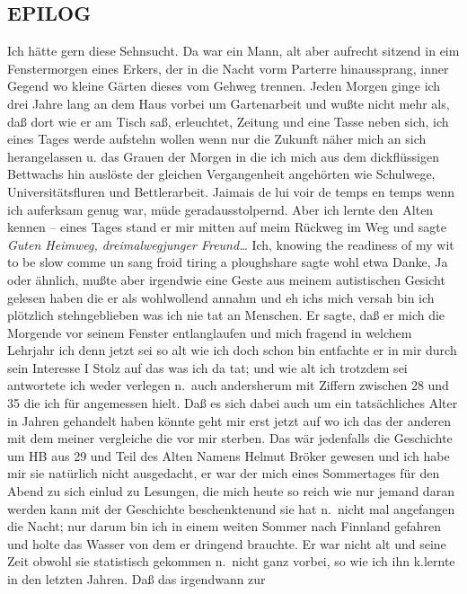 \documentclass[
]{article}
\author{}
\date{\vspace{-2.5em}}
\begin{document}
\subsection{EPILOG}\label{epilog}

Ich hätte gern diese Sehnsucht. Da war ein Mann, alt aber aufrecht
sitzend in eim Fenstermorgen eines Erkers, der in die Nacht vorm
Parterre hinaussprang, inner Gegend wo kleine Gärten dieses vom Gehweg
trennen. Jeden Morgen ginge ich drei Jahre lang an dem Haus vorbei um
Gartenarbeit und wußte nicht mehr als, daß dort wie er am Tisch saß,
erleuchtet, Zeitung und eine Tasse neben sich, ich eines Tages werde
aufstehn wollen wenn nur die Zukunft näher mich an sich herangelassen u.
das Grauen der Morgen in die ich mich aus dem dickflüssigen Bettwachs
hin auslöste der gleichen Vergangenheit angehörten wie Schulwege,
Universitätsfluren und Bettlerarbeit. J\textquotesingle aimais de lui
voir de temps en temps wenn ich auferksam genug war, müde
geradausstolpernd. Aber ich lernte den Alten kennen -- eines Tages stand
er mir mitten auf meim Rückweg im Weg und sagte \emph{Guten Heimweg,
dreimalwegjunger Freund\ldots{}} Ich, knowing the readiness of my wit to
be slow comme un sang froid tiring a ploughshare sagte wohl etwa Danke,
Ja oder ähnlich, mußte aber irgendwie eine Geste aus meinem autistischen
Gesicht gelesen haben die er als wohlwollend annahm und eh
ich\textquotesingle s mich versah bin ich plötzlich stehngeblieben was
ich nie tat an Menschen. Er sagte, daß er mich die Morgende vor seinem
Fenster entlanglaufen und mich fragend in welchem Lehrjahr ich denn
jetzt sei so alt wie ich doch schon bin entfachte er in mir durch sein
Interesse I Stolz auf das was ich da tat; und wie alt ich trotzdem sei
antwortete ich weder verlegen n.~auch andersherum mit Ziffern zwischen
28 und 35 die ich für angemessen hielt. Daß es sich dabei auch um ein
tatsächliches Alter in Jahren gehandelt haben könnte geht mir erst jetzt
auf wo ich das der anderen mit dem meiner vergleiche die vor mir
sterben. Das wär jedenfalls die Geschichte um HB aus 29 und Teil des
Alten Namens Helmut Bröker gewesen und ich habe mir sie natürlich nicht
ausgedacht, er war der mich eines Sommertages für den Abend zu sich
einlud zu Lesungen, die mich heute so reich wie nur jemand daran werden
kann mit der Geschichte beschenktenund sie hat n.~nicht mal angefangen
die Nacht; nur darum bin ich in einem weiten Sommer nach Finnland
gefahren und holte das Wasser von dem er dringend brauchte. Er war nicht
alt und seine Zeit obwohl sie statistisch gekommen n.~nicht ganz vorbei,
so wie ich ihn k.lernte in den letzten Jahren. Daß das irgendwann zur
\end{document}
